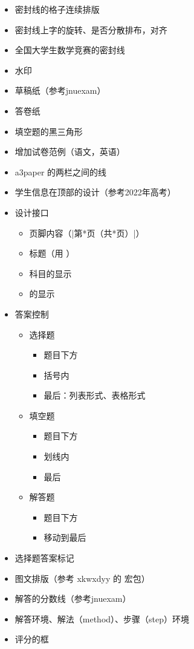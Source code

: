 \documentclass{ccnudoc}
\begin{document}
\begin{itemize}
  \item 密封线的格子连续排版
  \item 密封线上字的旋转、是否分散排布，对齐
  \item 全国大学生数学竞赛的密封线
  \item 水印
  \item 草稿纸（参考jnuexam）
  \item 答卷纸
  \item 填空题的黑三角形
  \item 增加试卷范例（语文，英语）
  \item a3paper 的两栏之间的线
    \begin{latexcode}[gobble = 6]
      \setlength{\columnseprule}{0.4pt}
    \end{latexcode}
  \item 学生信息在顶部的设计（参考2022年高考）
  \item 设计接口
    \begin{itemize}
      \item 页脚内容（|第*页（共*页）|）
      \item 标题（用 ）
      \item 科目的显示
      \item {} 的显示
    \end{itemize}
  \item 答案控制
    \begin{itemize}
      \item 选择题
        \begin{itemize}
          \item 题目下方
          \item 括号内
          \item 最后：列表形式、表格形式
        \end{itemize}
      \item 填空题
        \begin{itemize}
          \item 题目下方
          \item 划线内
          \item 最后
        \end{itemize}
      \item 解答题
        \begin{itemize}
          \item 题目下方
          \item 移动到最后
        \end{itemize}
    \end{itemize}
  \item 选择题答案标记
  \item 图文排版（参考 xkwxdyy 的  宏包）
  \item 解答的分数线（参考jnuexam）
  \item 解答环境、解法（method）、步骤（step）环境
  \item 评分的框
\end{itemize}

\end{document}
